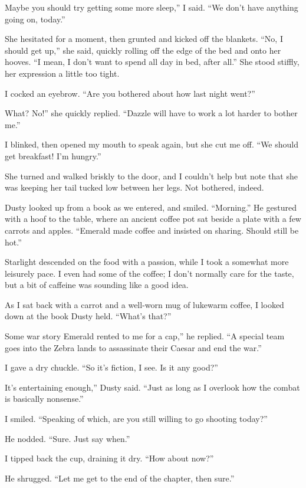 \leavevmode{}Maybe you should try getting some more sleep,” I said. “We don’t have anything going on, today.”

She hesitated for a moment, then grunted and kicked off the blankets. “No, I should get up,” she said, quickly rolling off the edge of the bed and onto her hooves. “I mean, I don’t want to spend all day in bed, after all.” She stood stiffly, her expression a little too tight.

I cocked an eyebrow. “Are you bothered about how last night went?”

\leavevmode{}What? No!” she quickly replied. “Dazzle will have to work a lot harder to bother me.”

I blinked, then opened my mouth to speak again, but she cut me off. “We should get breakfast! I’m hungry.”

She turned and walked briskly to the door, and I couldn’t help but note that she was keeping her tail tucked low between her legs. Not bothered, indeed.

Dusty looked up from a book as we entered, and smiled. “Morning.” He gestured with a hoof to the table, where an ancient coffee pot sat beside a plate with a few carrots and apples. “Emerald made coffee and insisted on sharing. Should still be hot.”

Starlight descended on the food with a passion, while I took a somewhat more leisurely pace. I even had some of the coffee; I don’t normally care for the taste, but a bit of caffeine was sounding like a good idea.

As I sat back with a carrot and a well-worn mug of lukewarm coffee, I looked down at the book Dusty held. “What’s that?”

\leavevmode{}Some war story Emerald rented to me for a cap,” he replied. “A special team goes into the Zebra lands to assassinate their Caesar and end the war.”

I gave a dry chuckle. “So it’s fiction, I see. Is it any good?”

\leavevmode{}It’s entertaining enough,” Dusty said. “Just as long as I overlook how the combat is basically nonsense.”

I smiled. “Speaking of which, are you still willing to go shooting today?”

He nodded. “Sure. Just say when.”

I tipped back the cup, draining it dry. “How about now?”

He shrugged. “Let me get to the end of the chapter, then sure.”

